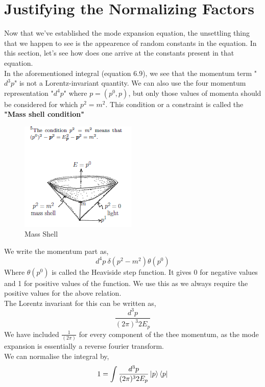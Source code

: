  \section{Justifying the Normalizing Factors}
 Now that we've established the mode expansion equation, the unsettling thing that we happen to see is the appearence of random constants in the equation. In this section, let's see how does one arrive at the constants present in that equation. \\
 In the aforementioned integral (equation 6.9),  we see that the momentum term "$d^{3}p$" is not a Lorentz-invariant quantity. We can also use the four momentum representation "$d^{4}p$" where $p= (p^{0}, p)$, but only those values of momenta should be considered for which $p^{2} = m^{2}$. This condition or a constraint is called the \textbf{"Mass shell condition"}
 \begin{figure}[h!]
     \centering
     \includegraphics{Figures/massshell.png}
     \caption{Mass Shell}
     \label{fig:my_label}
 \end{figure}
 We write the momentum part as, 
 \begin{equation}
     d^{4}p \: \delta (p^{2}- m^{2}) \theta(p^{0})
 \end{equation}
 Where $\theta(p^{0})$ is called the Heaviside step function. It gives 0 for negative values and 1 for positive values of the function. We use this as we always require the positive values for the above relation. \\
  The Lorentz invariant for this can be written as, 
  \begin{equation}
      \frac{d^{3}p}{(2\pi)^{3}2 E_{p}}
  \end{equation}
  We have included $\frac{1}{(2\pi)}$ for every component of the thee momentum, as the mode expansion is essentially  a reverse fourier transform. \\
  We can normalise the integral by, 
  \begin{equation}
      1= \int \frac{d^{3}p}{(2\pi)^{3}2 E_{p}} \ket{p} \bra{p}
  \end{equation}
